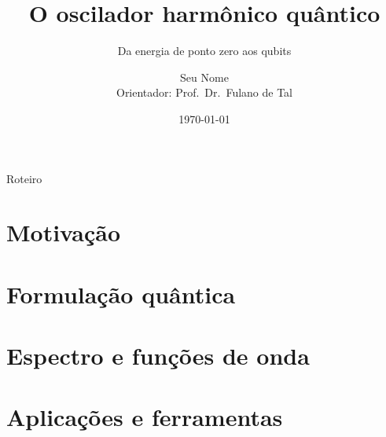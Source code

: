\documentclass[aspectratio=169,10pt]{beamer}
\title[Oscilador quântico]{O oscilador harmônico quântico}
\subtitle{Da energia de ponto zero aos qubits}
\author[Seu Nome]{\texorpdfstring{Seu Nome\\[2pt]
  {\small Orientador: Prof.\ Dr.\ Fulano de Tal}}{Seu Nome}}
\institute[UFXX]{Universidade Federal de Exemplo\\
  Bacharelado em Física}
\date{\today}
\begin{document}
\frame[plain]{\titlepage}

\begin{frame}{Roteiro}
  \begin{enumerate}
    \roteiro
  \end{enumerate}
\end{frame}

\AtBeginSection[]{%
  \begin{frame}[plain]
    \sectionpage
  \end{frame}%
}

\section{Motivação}



\section{Formulação quântica}



\section{Espectro e funções de onda}




\section{Aplicações e ferramentas}








\end{document}
